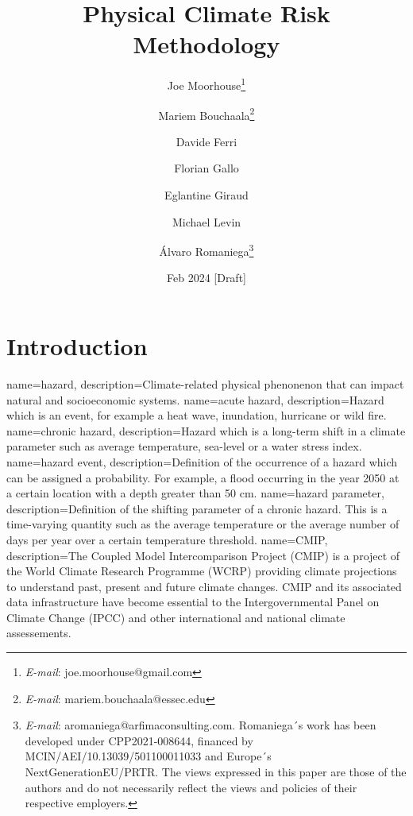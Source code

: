 \documentclass[a4paper,11pt]{extarticle} %
\title{Physical Climate Risk Methodology}
\author{Joe Moorhouse\thanks{\textit{E-mail}: joe.moorhouse@gmail.com}
        \and
        Mariem Bouchaala\thanks{\textit{E-mail}: mariem.bouchaala@essec.edu}
        \and
        Davide Ferri
        \and
        Florian Gallo
        \and
        Eglantine Giraud
        \and
        Michael Levin
        \and
        Álvaro Romaniega\thanks{\textit{E-mail}: aromaniega@arfimaconsulting.com. Romaniega´s work has been developed under CPP2021-008644, financed by MCIN/AEI/10.13039/501100011033 and Europe´s NextGenerationEU/PRTR.
        \smallskip
        \newline%
    The views expressed in this paper are those of the authors and do not necessarily reflect the views and policies of their respective employers.}
    }
\date{Feb 2024 [Draft]}
\theoremstyle{definition}
\begin{document}

\maketitle{}



\clearpage
\setcounter{tocdepth}{4}
\renewcommand{\contentsname}{Contents}
\tableofcontents




\clearpage
\section{Introduction}
\label{Sec:Introduction}

{
    name=hazard,
    description=Climate-related physical phenonenon that can impact natural and socioeconomic systems.
}
{
    name=acute hazard,
    description={Hazard which is an event, for example a heat wave, inundation, hurricane or wild fire.}
}
{
    name=chronic hazard,
    description={Hazard which is a long-term shift in a climate parameter such as average temperature, sea-level or a water stress index.}
}
{
    name=hazard event,
    description={Definition of the occurrence of a hazard which can be assigned a probability. For example, a flood occurring in the year 2050 at a certain location with a depth greater than 50 cm.}
}
{
    name=hazard parameter,
    description=Definition of the shifting parameter of a chronic hazard. This is a time-varying quantity such as the average temperature or the average number of days per year over a certain temperature threshold.
}
{
    name=CMIP,
    description={The Coupled Model Intercomparison Project (CMIP) is a project of the World Climate Research Programme (WCRP) providing climate projections to understand past, present and future climate changes. CMIP and its associated data infrastructure have become essential to the Intergovernmental Panel on Climate Change (IPCC) and other international and national climate assessements.}
}
\end{document}
